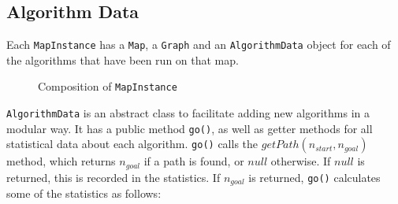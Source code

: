 \documentclass[12pt,twoside,notitlepage]{report}
\begin{document}
\subsection{Algorithm Data}

Each {\tt MapInstance} has a {\tt Map}, a {\tt Graph} and an {\tt AlgorithmData} object for each of the algorithms that have been run on that map.\\

\begin{figure}
\centering
{}
\caption{Composition of {\tt MapInstance}}
\end{figure}

\noindent
{\tt AlgorithmData} is an abstract class to facilitate adding new algorithms in a modular way. It has a public method {\tt go()}, as well as getter methods for all statistical data about each algorithm. {\tt go()} calls the $getPath(n_{start},n_{goal})$ method, which returns $n_{goal}$ if a path is found, or $null$ otherwise. If $null$ is returned, this is recorded in the statistics. If $n_{goal}$ is returned, {\tt go()} calculates some of the statistics as follows:
\end{document}
